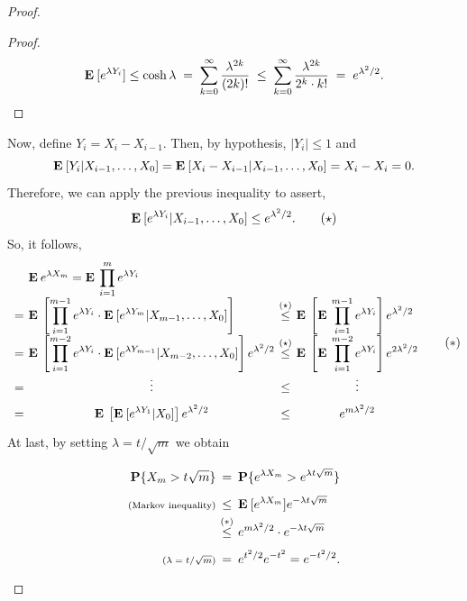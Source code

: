 \begin{proof}
\begin{proof}
    \[
        \mathbf{E}\:[e^{\lambda Y_i}]\leq \cosh \lambda \;=\; \sum_{k = 0}^\infty \frac{\lambda^{2k}}{(2k)!} \;\leq\; \sum_{k = 0}^\infty \frac{\lambda^{2k}}{2^k \cdot k!} \;=\; e^{\lambda^2 / 2}.
    \]

    \end{proof}

    Now, define $Y_i = X_i - X_{i-1}$. Then, by hypothesis, $|Y_i| \leq 1$ and
    \[ \mathbf{E}\: [Y_i | X_{i-1},\ldots, X_0] = \mathbf{E}\: [X_i - X_{i-1} | X_{i-1},\ldots, X_0] = X_i - X_i = 0. \] 
    Therefore, we can apply the previous inequality to assert,
    \[ \mathbf{E}\: [e^{\lambda Y_i} | X_{i-1},\ldots, X_0] \leq e^{\lambda^2/2}. \tag*{$ (\star) $}\]
    So, it follows,
    \[ \everymath{\displaystyle}\arraycolsep=1.8pt\def\arraystretch{1.8}
        \begin{array}{r c c c l}
        & & 
        \E e^{\lambda X_m}  =   \E \prod_{i = 1}^{m} e^{\lambda Y_i} \hfill\\
        & = & \E\left[\prod_{i = 1}^{m-1} e^{\lambda Y_i} \cdot \E[e^{\lambda Y_m} | X_{m-1},\ldots, X_0]\right] \hfill & \overset{(\star)}{\leq} & \E\left[\E \prod_{i = 1}^{m-1} e^{\lambda Y_i} \right] e^{\lambda^2 / 2}\\
        & = & \E\left[\prod_{i = 1}^{m-2} e^{\lambda Y_i} \cdot \E[e^{\lambda Y_{m-1}} | X_{m-2},\ldots, X_0]\right]e^{\lambda^2 / 2} & \overset{(\star)}{\leq} & \E\left[\E \prod_{i = 1}^{m-2} e^{\lambda Y_i} \right] e^{2\lambda^2 / 2}\\
        & = & \hfill\vdots\hfill & \leq & \hfill\vdots\hfill\\
        & = & \E\left[\E[e^{\lambda Y_{1}} |  X_0]\right]e^{\lambda^2 / 2} & \leq & \hfill e^{m\lambda^2/2} \hfill
    \end{array} \tag*{$(*)$} \]
    At last, by setting $\lambda = t/\sqrt{m}$ we obtain
    \[ \everymath{\displaystyle}\arraycolsep=1.8pt\def\arraystretch{1.8}
    \begin{array}{r c l}
        \P\{X_m > t\sqrt{m}\} & = & \P\{e^{\lambda X_m} > e^{\lambda t \sqrt{m}}\} \\
        \text{\scriptsize (Markov inequality)}& \leq & \E[e^{\lambda X_m} ] e^{-\lambda t \sqrt{m}}\\
        & \overset{(*)}{\leq} & e^{m\lambda^2/2} \cdot e^{-\lambda t \sqrt{m}}\\
        \text{\scriptsize ($\lambda = t/\sqrt{m}$)} & = & e^{t^2/2} e^{-t^2} = e^{-t^2 / 2}.
    \end{array}    
    \]
\end{proof}

